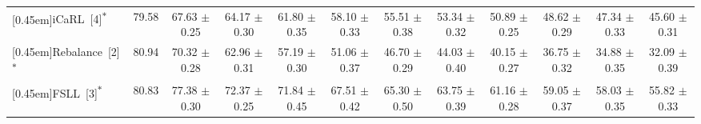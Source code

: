 \documentclass{article}
\begin{document}
\begin{table*}[ht]
{\begin{tabular}{lccccccccccc}
  \rule{0pt}{5ex}\multirow{1}{*}[0.45em]{iCaRL~[4]\textsuperscript{$\ast$} }     & \multirow{1}{*}[0.5em]{79.58} & \shortstack[r]{67.63 \\ $\pm$  0.25} & \shortstack[r]{64.17\\ $\pm$  0.30} & \shortstack[r]{61.80 \\ $\pm$  0.35} & \shortstack[r]{58.10 \\ $\pm$  0.33} & \shortstack[r]{55.51\\ $\pm$  0.38} & \shortstack[r]{53.34 \\ $\pm$  0.32} & \shortstack[r]{50.89 \\ $\pm$  0.25} & \shortstack[r]{48.62\\ $\pm$  0.29} & \shortstack[r]{47.34\\ $\pm$  0.33} & \shortstack[r]{45.60\\ $\pm$  0.31}\\
  \rule{0pt}{5ex}\multirow{1}{*}[0.45em]{Rebalance~[2]\textsuperscript{$\ast$} }   & \multirow{1}{*}[0.5em]{80.94} & \shortstack[r]{70.32 \\ $\pm$  0.28} & \shortstack[r]{62.96 \\ $\pm$  0.31} & \shortstack[r]{57.19 \\ $\pm$  0.30} & \shortstack[r]{51.06 \\ $\pm$  0.37} & \shortstack[r]{46.70 \\ $\pm$  0.29} & \shortstack[r]{44.03 \\ $\pm$  0.40} & \shortstack[r]{40.15 \\ $\pm$  0.27} & \shortstack[r]{36.75 \\ $\pm$  0.32} & \shortstack[r]{34.88 \\ $\pm$  0.35} & \shortstack[r]{32.09 \\ $\pm$  0.39}\\
  \rule{0pt}{5ex}\multirow{1}{*}[0.45em]{FSLL~[3]\textsuperscript{$\ast$} }       & \multirow{1}{*}[0.5em]{80.83} & \shortstack[r]{77.38 \\ $\pm$  0.30} & \shortstack[r]{72.37 \\ $\pm$  0.25} & \shortstack[r]{71.84 \\ $\pm$  0.45} & \shortstack[r]{67.51 \\ $\pm$  0.42} & \shortstack[r]{65.30 \\ $\pm$  0.50} & \shortstack[r]{63.75 \\ $\pm$  0.39} & \shortstack[r]{61.16 \\ $\pm$  0.28} & \shortstack[r]{59.05 \\ $\pm$  0.37} & \shortstack[r]{58.03 \\ $\pm$  0.35} & \shortstack[r]{55.82 \\ $\pm$  0.33}\\

\end{tabular}}
\end{table*}
\end{document}

